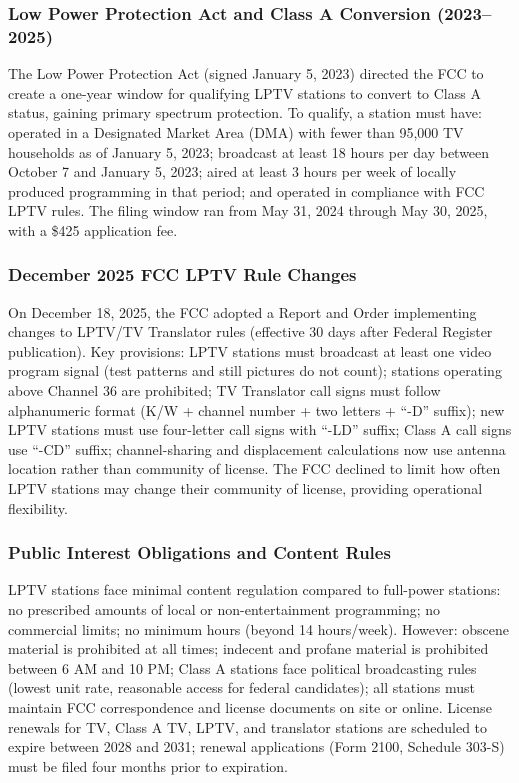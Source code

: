 \documentclass[11pt,letterpaper]{article}
\begin{document}
\subsubsection{Low Power Protection Act and Class A Conversion (2023--2025)}

The Low Power Protection Act (signed January 5, 2023) directed the FCC to create a one-year window for qualifying LPTV stations to convert to Class A status, gaining primary spectrum protection. To qualify, a station must have: operated in a Designated Market Area (DMA) with fewer than 95,000 TV households as of January 5, 2023; broadcast at least 18 hours per day between October 7 and January 5, 2023; aired at least 3 hours per week of locally produced programming in that period; and operated in compliance with FCC LPTV rules. The filing window ran from May 31, 2024 through May 30, 2025, with a \$425 application fee.

\subsubsection{December 2025 FCC LPTV Rule Changes}

On December 18, 2025, the FCC adopted a Report and Order implementing changes to LPTV/TV Translator rules (effective 30 days after Federal Register publication). Key provisions: LPTV stations must broadcast at least one video program signal (test patterns and still pictures do not count); stations operating above Channel 36 are prohibited; TV Translator call signs must follow alphanumeric format (K/W + channel number + two letters + ``-D'' suffix); new LPTV stations must use four-letter call signs with ``-LD'' suffix; Class A call signs use ``-CD'' suffix; channel-sharing and displacement calculations now use antenna location rather than community of license. The FCC declined to limit how often LPTV stations may change their community of license, providing operational flexibility.

\subsubsection{Public Interest Obligations and Content Rules}

LPTV stations face minimal content regulation compared to full-power stations: no prescribed amounts of local or non-entertainment programming; no commercial limits; no minimum hours (beyond 14 hours/week). However: obscene material is prohibited at all times; indecent and profane material is prohibited between 6 AM and 10 PM; Class A stations face political broadcasting rules (lowest unit rate, reasonable access for federal candidates); all stations must maintain FCC correspondence and license documents on site or online. License renewals for TV, Class A TV, LPTV, and translator stations are scheduled to expire between 2028 and 2031; renewal applications (Form 2100, Schedule 303-S) must be filed four months prior to expiration.
\end{document}

